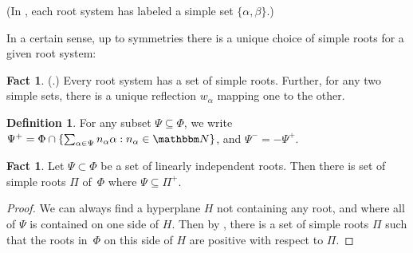 \documentclass[10pt,a4paper]{article}
\theoremstyle{definition}
\newtheorem{definition}[theorem]{Definition}
\newtheorem{fact}[theorem]{Fact}
\newcommand{\N}{\mathbbm N}
\newcommand{\hgt}{{\mathrm{ht}}}
\begin{document}
\noindent (In , each root system has labeled a simple set $\{\alpha,\beta\}$.)

In a certain sense, up to symmetries there is a unique choice of simple roots for a given root system:
\begin{fact} (\cite[Prop.~2.1.2, Cor~2.2.5]{Car89}.)
    Every root system has a set of simple roots.
    Further, for any two simple sets, there is a unique reflection $w_\alpha$ mapping one to the other.
%
\end{fact}

\begin{definition}
For any subset $\Psi \subseteq \Phi$, we write $\Psi^+ = \Phi \cap \{\sum_{\alpha \in \Psi} n_\alpha \alpha : n_\alpha \in \N\}$, and $\Psi^{-} = -\Psi^+$.
\end{definition}

\begin{fact}\label{fact:simplechoice}
Let $\Psi \subset \Phi$ be a set of linearly independent roots. Then there is set of simple roots $\Pi$ of~$\Phi$ where $\Psi \subseteq \Pi^+$.
\end{fact}
\begin{proof}
We can always find a hyperplane $H$ not containing any root, and where all of $\Psi$ is contained on one side of $H$. Then by \cite[Thm.~8.16]{Hal03}, there is a set of simple roots $\Pi$ such that the roots in~$\Phi$ on this side of $H$ are positive with respect to $\Pi$.
\end{proof}
\end{document}
